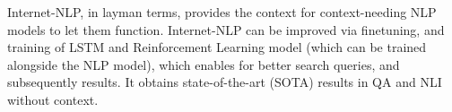 Internet-NLP, in layman terms, provides the context for context-needing NLP models to let them function. Internet-NLP can be improved via finetuning, and training of LSTM and Reinforcement Learning model (which can be trained alongside the NLP model), which enables for better search queries, and subsequently results. It obtains state-of-the-art (SOTA) results in QA and NLI without context.
